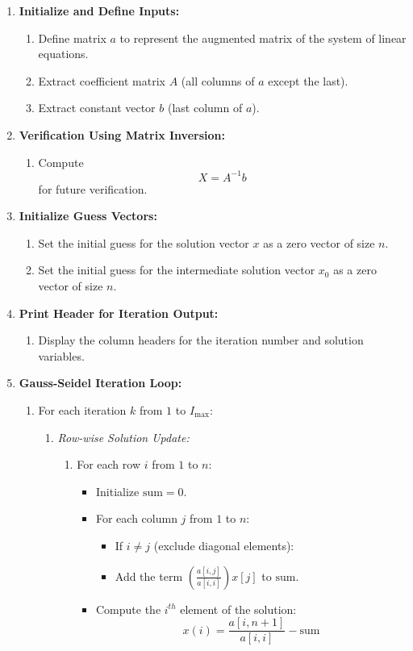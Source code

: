\documentclass[a4paper,12pt]{article}
\begin{document}
\begin{enumerate}
	\item \textbf{Initialize and Define Inputs:}
	\begin{enumerate}
		\item Define matrix $a$ to represent the augmented matrix of the system of linear equations.
		\item Extract coefficient matrix $A$ (all columns of $a$ except the last).
		\item Extract constant vector $b$ (last column of $a$).
	\end{enumerate}
	
	\item \textbf{Verification Using Matrix Inversion:}
	\begin{enumerate}
		\item Compute $$ X = A^{-1}b $$ for future verification.
	\end{enumerate}
	
	\item \textbf{Initialize Guess Vectors:}
	\begin{enumerate}
		\item Set the initial guess for the solution vector $x$ as a zero vector of size $n$.
		\item Set the initial guess for the intermediate solution vector $x_0$ as a zero vector of size $n$.
	\end{enumerate}
	
	\item \textbf{Print Header for Iteration Output:}
	\begin{enumerate}
		\item Display the column headers for the iteration number and solution variables.
	\end{enumerate}
	
	\item \textbf{Gauss-Seidel Iteration Loop:}
	\begin{enumerate}
		\item For each iteration $k$ from $1$ to $I_{\text{max}}$:
		\begin{enumerate}
			\item \textit{Row-wise Solution Update:}
			\begin{enumerate}
				\item For each row $i$ from $1$ to $n$:
				\begin{itemize}
					\item Initialize $\text{sum} = 0$.
					\item For each column $j$ from $1$ to $n$:
					\begin{itemize}
						\item If $i \ne j$ (exclude diagonal elements):
						\item Add the term $\left( \frac{a[i,j]}{a[i,i]} \right) x[j]$ to $\text{sum}$.
					\end{itemize}
					\item Compute the $i^{th}$ element of the solution:
					$$
					x(i) = \frac{a[i,n+1]}{a[i,i]} - \text{sum}
					$$
				\end{itemize}
			\end{enumerate}
			

\end{enumerate}
\end{enumerate}
\end{enumerate}
\end{document}
